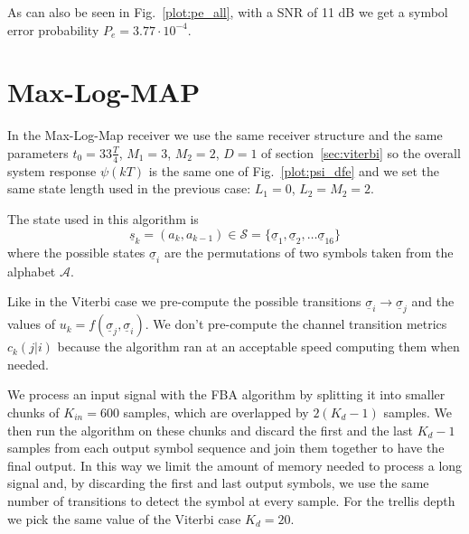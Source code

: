 \documentclass[a4paper,oneside]{article}
\renewcommand{\vec}[1]{\underline{#1}}
\newcommand{\vsigma}[0]{\vec{\sigma}}
\begin{document}
As can also be seen in Fig.~\ref{plot:pe_all}, with a SNR of 11 dB we
get a symbol error probability {\color{red}$P_e = 3.77 \cdot 10^{-4}$.}
\section{Max-Log-MAP}
In the Max-Log-Map receiver we use the same receiver structure and the
same parameters $t_0 = 33\frac{T}{4}$, $M_1 = 3$, $M_2 = 2$, $D=1$ of
section~\ref{sec:viterbi} so the overall system response $\psi(kT)$ is
the same one of Fig.~\ref{plot:psi_dfe} and we set the same state
length used in the previous case: $L_1 = 0$, $L_2 = M_2 = 2$.

The state used in this algorithm is
\begin{equation}
  \vec{s}_k = (a_k,a_{k-1}) \in \mathcal{S} = \{ \vec{\sigma}_1, \vec{\sigma}_2, \dots \vec{\sigma}_{16} \}
\end{equation}
where the possible states $\vsigma_i$ are the permutations of two
symbols taken from the alphabet $\mathcal{A}$.

Like in the Viterbi case we pre-compute the possible transitions
$\vsigma_i \rightarrow \vsigma_j$ and the values of $u_k =
f(\vsigma_j, \vsigma_i)$. We don't pre-compute the channel transition
metrics $c_k(j | i)$ because the algorithm ran at an acceptable speed
computing them when needed.

We process an input signal with the FBA algorithm by splitting it into
smaller chunks of $K_{in} = 600$ samples, which are overlapped by
$2(K_d-1)$ samples. We then run the algorithm on these chunks and
discard the first and the last $K_d-1$ samples from each output symbol
sequence and join them together to have the final output.  In this way
we limit the amount of memory needed to process a long signal and, by
discarding the first and last output symbols, we use the same number
of transitions to detect the symbol at every sample.  For the trellis
depth we pick the same value of the Viterbi case $K_d = 20$.
\end{document}
